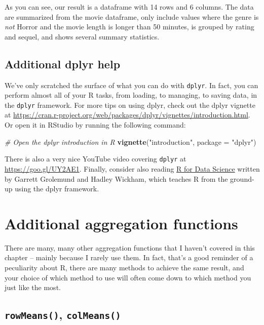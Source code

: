 \documentclass[]{book}
\newenvironment{Shaded}{\begin{snugshade}}{\end{snugshade}}
\newcommand{\KeywordTok}[1]{\textcolor[rgb]{0.13,0.29,0.53}{\textbf{#1}}}
\newcommand{\DataTypeTok}[1]{\textcolor[rgb]{0.13,0.29,0.53}{#1}}
\newcommand{\StringTok}[1]{\textcolor[rgb]{0.31,0.60,0.02}{#1}}
\newcommand{\CommentTok}[1]{\textcolor[rgb]{0.56,0.35,0.01}{\textit{#1}}}
\newcommand{\NormalTok}[1]{#1}
\theoremstyle{definition}
\theoremstyle{definition}
\theoremstyle{remark}
\begin{document}
As you can see, our result is a dataframe with 14 rows and 6 columns.
The data are summarized from the movie dataframe, only include values
where the genre is \emph{not} Horror and the movie length is longer than
50 minutes, is grouped by rating and sequel, and shows several summary
statistics.

\subsection{Additional dplyr help}\label{additional-dplyr-help}

We've only scratched the surface of what you can do with \texttt{dplyr}.
In fact, you can perform almost all of your R tasks, from loading, to
managing, to saving data, in the \texttt{dplyr} framework. For more tips
on using dplyr, check out the dplyr vignette at
\url{https://cran.r-project.org/web/packages/dplyr/vignettes/introduction.html}.
Or open it in RStudio by running the following command:

\begin{Shaded}
\begin{Highlighting}[]
\CommentTok{# Open the dplyr introduction in R}
\KeywordTok{vignette}\NormalTok{(}\StringTok{"introduction"}\NormalTok{, }\DataTypeTok{package =} \StringTok{"dplyr"}\NormalTok{)}
\end{Highlighting}
\end{Shaded}

There is also a very nice YouTube video covering \texttt{dplyr} at
\url{https://goo.gl/UY2AE1}. Finally, consider also reading
\href{http://r4ds.had.co.nz/}{R for Data Science} written by Garrett
Grolemund and Hadley Wickham, which teaches R from the ground-up using
the dplyr framework.

\section{Additional aggregation
functions}\label{additional-aggregation-functions}

There are many, many other aggregation functions that I haven't covered
in this chapter -- mainly because I rarely use them. In fact, that's a
good reminder of a peculiarity about R, there are many methods to
achieve the same result, and your choice of which method to use will
often come down to which method you just like the most.

\subsection{\texorpdfstring{\texttt{rowMeans()},
\texttt{colMeans()}}{rowMeans(), colMeans()}}\label{rowmeans-colmeans}
\end{document}
